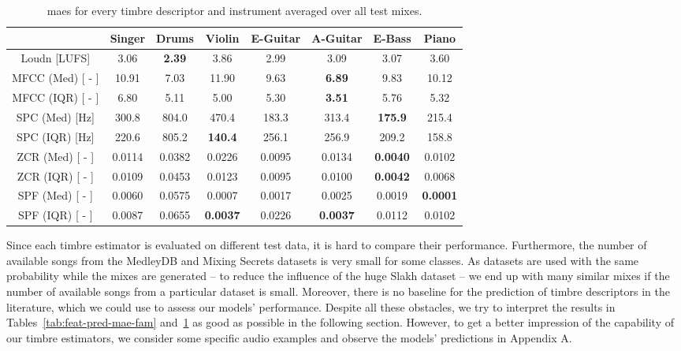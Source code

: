 \begin{table}[]
	\centering
	\begin{tabular}{c|c|c|c|c|c|c|c}
		                & Singer & Drums  & Violin & E-Guitar & A-Guitar & E-Bass & Piano \\ \hline
		Loudn [LUFS]	& 3.06   & \textbf{2.39}   & 3.86   & 2.99     & 3.09     & 3.07   & 3.60 \\ \hline
		MFCC (Med) [ - ]& 10.91  & 7.03   & 11.90  & 9.63     & \textbf{6.89}     & 9.83   & 10.12 \\ \hline
		MFCC (IQR) [ - ]& 6.80   & 5.11   & 5.00   & 5.30     & \textbf{3.51}     & 5.76   & 5.32\\ \hline
		SPC (Med) [Hz]	& 300.8  & 804.0  & 470.4  & 183.3    & 313.4    & \textbf{175.9}  & 215.4\\ \hline
		SPC (IQR) [Hz]	& 220.6  & 805.2  & \textbf{140.4}  & 256.1    & 256.9    & 209.2  & 158.8\\ \hline
		ZCR (Med) [ - ] & 0.0114 & 0.0382 & 0.0226 & 0.0095   & 0.0134   & \textbf{0.0040} & 0.0102\\ \hline
		ZCR (IQR) [ - ] & 0.0109 & 0.0453 & 0.0123 & 0.0095   & 0.0100   & \textbf{0.0042} & 0.0068 \\ \hline
		SPF (Med) [ - ] & 0.0060 & 0.0575 & 0.0007 & 0.0017   & 0.0025   & 0.0019 & \textbf{0.0001} \\ \hline
		SPF (IQR) [ - ] & 0.0087 & 0.0655 & \textbf{0.0037} & 0.0226   & \textbf{0.0037}   & 0.0112 & 0.0102 \\
	\end{tabular}
	\caption{\Glspl{mae} for every timbre descriptor and instrument averaged over all test mixes.}
	\label{tab:feat-pred-mae-class}
\end{table}

Since each timbre estimator is evaluated on different test data, it is hard to compare their performance. Furthermore, the number of available songs from the MedleyDB and Mixing Secrets datasets is very small for some classes. As datasets are used with the same probability while the mixes are generated -- to reduce the influence of the huge Slakh dataset -- we end up with many similar mixes if the number of available songs from a particular dataset is small. Moreover, there is no baseline for the prediction of timbre descriptors in the literature, which we could use to assess our models' performance. Despite all these obstacles, we try to interpret the results in Tables~\ref{tab:feat-pred-mae-fam} and~\ref{tab:feat-pred-mae-class} as good as possible in the following section. However, to get a better impression of the capability of our timbre estimators, we consider some specific audio examples and observe the models' predictions in Appendix A.\\

